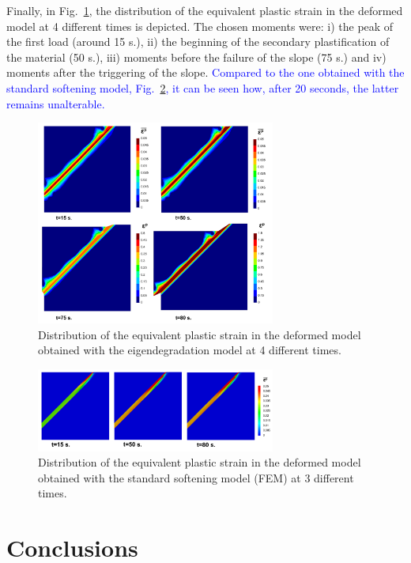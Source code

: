 \documentclass[applsci,journal,article,submit,moreauthors,pdftex]{Definitions/mdpi}
\begin{document}
Finally, in Fig.~\ref{fig_VC4}, the distribution of the equivalent plastic strain in the deformed model at 4 different times is depicted. The chosen moments were: i) the peak of the first load (around 15 s.), ii) the beginning of the secondary plastification of the material (50 s.), iii) moments before the failure of the slope (75 s.) and iv) moments after the triggering of the slope. \textcolor{blue}{Compared to the one obtained with the standard softening model, Fig.~\ref{fig_VC5}, it can be seen how, after 20 seconds, the latter remains unalterable.}

\begin{figure}
\includegraphics[width=0.7\textwidth]{Figs/EP_VC.pdf}
\caption{Distribution of the equivalent plastic strain in the deformed model obtained with the eigendegradation model at 4 different times.}
\label{fig_VC4}
\end{figure}
\begin{figure}
\includegraphics[width=0.7\textwidth]{Figs/abaqus.pdf}
\caption{Distribution of the equivalent plastic strain in the deformed model obtained with the standard softening model (FEM) at 3 different times.}
\label{fig_VC5}
\end{figure}

\section{Conclusions}
\end{document}

